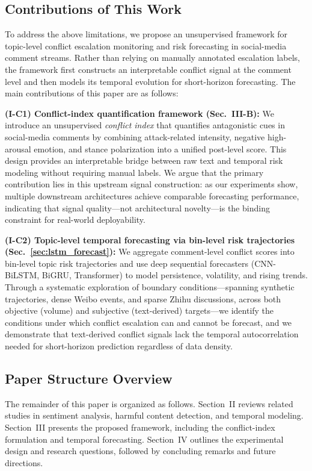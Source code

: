 \documentclass[journal]{IEEEtran}
\begin{document}
\subsection{Contributions of This Work}

To address the above limitations, we propose an unsupervised framework for topic-level conflict escalation monitoring and risk forecasting in social-media comment streams. Rather than relying on manually annotated escalation labels, the framework first constructs an interpretable conflict signal at the comment level and then models its temporal evolution for short-horizon forecasting. The main contributions of this paper are as follows:

\noindent\textbf{(I-C1) Conflict-index quantification framework (Sec.~III-B):}
We introduce an unsupervised \emph{conflict index} that quantifies antagonistic cues in social-media comments by combining attack-related intensity, negative high-arousal emotion, and stance polarization into a unified post-level score. This design provides an interpretable bridge between raw text and temporal risk modeling without requiring manual labels. We argue that the primary contribution lies in this upstream signal construction: as our experiments show, multiple downstream architectures achieve comparable forecasting performance, indicating that signal quality---not architectural novelty---is the binding constraint for real-world deployability.

\noindent\textbf{(I-C2) Topic-level temporal forecasting via bin-level risk trajectories (Sec.~\ref{sec:lstm_forecast}):}
We aggregate comment-level conflict scores into bin-level topic risk trajectories and use deep sequential forecasters (CNN-BiLSTM, BiGRU, Transformer) to model persistence, volatility, and rising trends. Through a systematic exploration of boundary conditions---spanning synthetic trajectories, dense Weibo events, and sparse Zhihu discussions, across both objective (volume) and subjective (text-derived) targets---we identify the conditions under which conflict escalation can and cannot be forecast, and we demonstrate that text-derived conflict signals lack the temporal autocorrelation needed for short-horizon prediction regardless of data density.

\subsection{Paper Structure Overview}
The remainder of this paper is organized as follows. Section~II reviews related studies in sentiment analysis, harmful content detection, and temporal modeling. Section~III presents the proposed framework, including the conflict-index formulation and temporal forecasting. Section~IV outlines the experimental design and research questions, followed by concluding remarks and future directions.
\end{document}
